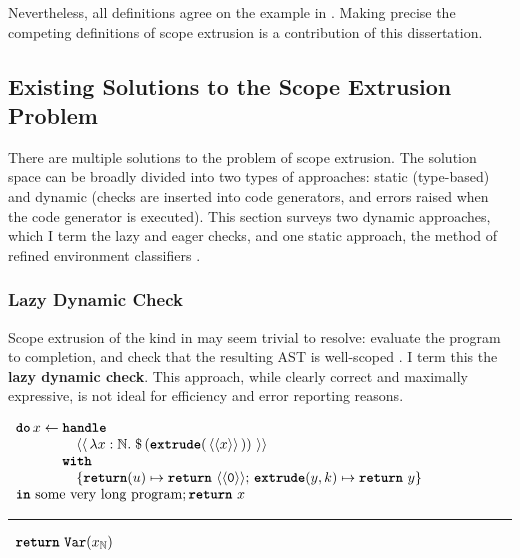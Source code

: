 Nevertheless, all definitions agree on the example in . Making precise the competing definitions of scope extrusion is a contribution of this dissertation. 

\subsection{Existing Solutions to the Scope Extrusion Problem}
There are multiple solutions to the problem of scope extrusion. The solution space can be broadly divided into two types of approaches: static (type-based) and dynamic (checks are inserted into code generators, and errors raised when the code generator is executed). This section surveys two dynamic approaches, which I term the lazy and eager checks, and one static approach, the method of refined environment classifiers \citep{kiselyov-16,isoda-24}. 

\subsubsection{Lazy Dynamic Check}\label{subsubsection:lazy-dynamic-check}
Scope extrusion of the kind in  may seem trivial to resolve: evaluate the program to completion, and check that the resulting AST is well-scoped \citep{kiselyov-14}. I term this the \textbf{lazy dynamic check}. This approach, while clearly correct and maximally expressive, is not ideal for efficiency and error reporting reasons. 

\begin{code}
  \begin{efflst}
    $\begin{array}{l}
      \textbf{\texttt{do}} \,  x \leftarrow \textbf{\texttt{handle}} \\
      \quad \quad \quad \quad \,\, \equote[\, {\lambda x:\mathbb{N}.\; \splice[\, {(\textbf{\texttt{extrude}}(\, \equote[x] \, ))}\, ]} \, ] \\
      \quad \quad \quad \,\, \textbf{\texttt{with}} \\
      \quad \quad \quad \quad \, \, \{ \textbf{\texttt{return}}(u) \mapsto {\return{\equote[\texttt{0}]}}; \, \textbf{\texttt{extrude}}(y, k) \mapsto {\return{y}}\}\\
      \textbf{\texttt{in}} \text{ some very long program}; \return{x}
    \end{array}$

    \vspace{2mm} 
\textcolor{effComment}{\hrule height 0.2mm \relax}
\vspace{2mm} 

\textcolor{effComment}{$\begin{array}{l}\return{\Var{x}{\mathbb{N}}}\end{array}$}

\end{efflst}
%
\label{listing:efflang-lazy-scope-extrusion-inefficient}
\end{code}

